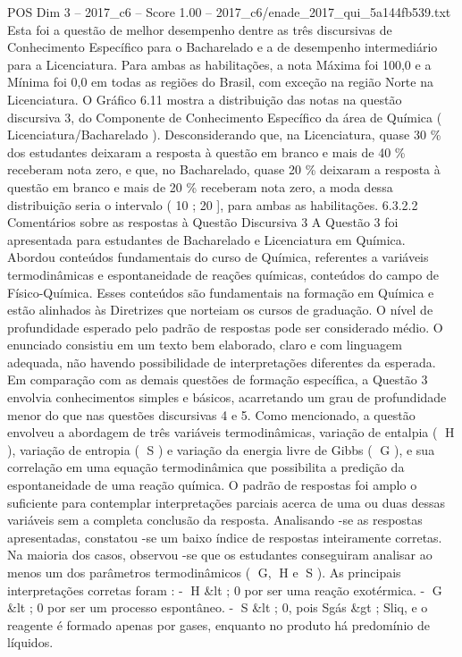 \begin{textsample}{POS Dim 3 – 2017\_c6 – Score 1.00 – 2017\_c6/enade\_2017\_qui\_5a144fb539.txt}
Esta foi a questão de melhor desempenho dentre as três discursivas de Conhecimento Específico para o Bacharelado e a de desempenho intermediário para a Licenciatura.
Para ambas as habilitações, a nota Máxima foi 100,0 e a Mínima foi 0,0 em todas as regiões do Brasil, com exceção na região Norte na Licenciatura.
O Gráfico 6.11 mostra a distribuição das notas na questão discursiva 3, do Componente de Conhecimento Específico da área de Química ( Licenciatura/Bacharelado ).
Desconsiderando que, na Licenciatura, quase 30 \% dos estudantes deixaram a resposta à questão em branco e mais de 40 \% receberam nota zero, e que, no Bacharelado, quase 20 \% deixaram a resposta à questão em branco e mais de 20 \% receberam nota zero, a moda dessa distribuição seria o intervalo ( 10 ; 20 ], para ambas as habilitações. 6.3.2.2 Comentários sobre as respostas à Questão Discursiva 3 A Questão 3 foi apresentada para estudantes de Bacharelado e Licenciatura em Química.
Abordou conteúdos fundamentais do curso de Química, referentes a variáveis termodinâmicas e espontaneidade de reações químicas, conteúdos do campo de Físico-Química.
Esses conteúdos são fundamentais na formação em Química e estão alinhados às Diretrizes que norteiam os cursos de graduação.
O nível de profundidade esperado pelo padrão de respostas pode ser considerado médio.
O enunciado consistiu em um texto bem elaborado, claro e com linguagem adequada, não havendo possibilidade de interpretações diferentes da esperada.
Em comparação com as demais questões de formação específica, a Questão 3 envolvia conhecimentos simples e básicos, acarretando um grau de profundidade menor do que nas questões discursivas 4 e 5.
Como mencionado, a questão envolveu a abordagem de três variáveis termodinâmicas, variação de entalpia ( H ), variação de entropia ( S ) e variação da energia livre de Gibbs ( G ), e sua correlação em uma equação termodinâmica que possibilita a predição da espontaneidade de uma reação química.
O padrão de respostas foi amplo o suficiente para contemplar interpretações parciais acerca de uma ou duas dessas variáveis sem a completa conclusão da resposta.
Analisando -se as respostas apresentadas, constatou -se um baixo índice de respostas inteiramente corretas.
Na maioria dos casos, observou -se que os estudantes conseguiram analisar ao menos um dos parâmetros termodinâmicos ( G, H e S ).
As principais interpretações corretas foram : - H \&lt ; 0 por ser uma reação exotérmica. - G \&lt ; 0 por ser um processo espontâneo. - S \&lt ; 0, pois Sgás \&gt ; Sliq, e o reagente é formado apenas por gases, enquanto no produto há predomínio de líquidos.

\end{textsample}
